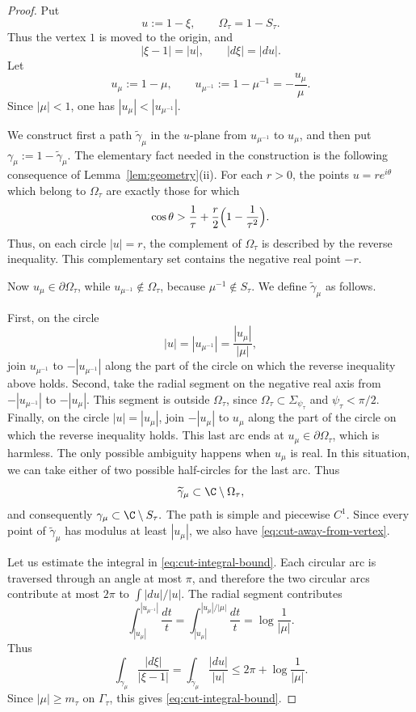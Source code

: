 \documentclass[11pt]{amsart}
\numberwithin{equation}{section}
\theoremstyle{definition}
\theoremstyle{plain}
\begin{document}
\begin{proof}
Put
\[
        u:=1-\xi,
        \qquad
        \Omega_\tau=1-S_\tau .
\]
Thus the vertex \(1\) is moved to the origin, and
\[
        |\xi-1|=|u|,
        \qquad
        |d\xi|=|du|.
\]
Let
\[
        u_\mu:=1-\mu,
        \qquad
        u_{\mu^{-1}}:=1-\mu^{-1}
        =-\frac{u_\mu}{\mu}.
\]
Since \(|\mu|<1\), one has \(|u_\mu|<|u_{\mu^{-1}}|\).

We construct first a path \(\widetilde\gamma_\mu\) in the \(u\)-plane from
\(u_{\mu^{-1}}\) to \(u_\mu\), and then put
\(\gamma_\mu:=1-\widetilde\gamma_\mu\).  The elementary fact needed in the construction is the following consequence of
Lemma~\ref{lem:geometry}\textup{(ii)}.  For each \(r>0\), the points
\(u=re^{i\theta}\) which belong to \(\Omega_\tau\) are exactly those for which
\[
        \cos\theta>
        \frac1\tau+\frac r2\Bigl(1-\frac1{\tau^2}\Bigr).
\]
Thus, on each circle \(|u|=r\), the complement of \(\Omega_\tau\) is described
by the reverse inequality.  This complementary set contains the negative real
point \(-r\).

Now \(u_\mu\in\partial\Omega_\tau\), while
\(u_{\mu^{-1}}\notin\Omega_\tau\), because \(\mu^{-1}\notin S_\tau\).  We
define \(\widetilde\gamma_\mu\) as follows.

First, on the circle
\[
        |u|=|u_{\mu^{-1}}|=\frac{|u_\mu|}{|\mu|},
\]
join \(u_{\mu^{-1}}\) to \(-|u_{\mu^{-1}}|\) along the part of the circle on which
the reverse inequality above holds.
Second, take the radial segment on the negative real axis from
\(-|u_{\mu^{-1}}|\) to \(-|u_\mu|\).  This segment is outside
\(\Omega_\tau\), since \(\Omega_\tau\subset\Sigma_{\psi_\tau}\) and
\(\psi_\tau<\pi/2\).  Finally, on the circle \(|u|=|u_\mu|\), join \(-|u_\mu|\) to \(u_\mu\) along
the part of the circle on which the reverse inequality holds.  This last arc
ends at \(u_\mu\in\partial\Omega_\tau\), which is harmless. 
 The only possible ambiguity happens when $u_\mu$ is real. In this situation, we can take either of two possible half-circles for the last arc. 
Thus
\[
        \widetilde\gamma_\mu\subset\C\setminus\Omega_\tau,
\]
and consequently
\(
   \gamma_\mu\subset\C\setminus S_\tau.
\)
The path is simple and piecewise \(C^1\).  Since every point of
\(\widetilde\gamma_\mu\) has modulus at least \(|u_\mu|\), we also have
\eqref{eq:cut-away-from-vertex}.

Let us estimate the integral in \eqref{eq:cut-integral-bound}.  Each circular
arc is traversed through an angle at most \(\pi\), and therefore the two
circular arcs contribute at most \(2\pi\) to \(\int |du|/|u|\).  The radial
segment contributes
\[
        \int_{|u_\mu|}^{|u_{\mu^{-1}}|}\frac{dt}{t}
        =
        \int_{|u_\mu|}^{|u_\mu|/|\mu|}\frac{dt}{t}
        =
        \log\frac1{|\mu|}.
\]
Thus
\[
        \int_{\gamma_\mu}\frac{|d\xi|}{|\xi-1|}
        =
        \int_{\widetilde\gamma_\mu}\frac{|du|}{|u|}
        \le
        2\pi+\log\frac1{|\mu|}.
\]
Since \(|\mu|\ge m_\tau\) on \(\Gamma_\tau\), this gives
\eqref{eq:cut-integral-bound}.


\end{proof}
\end{document}
